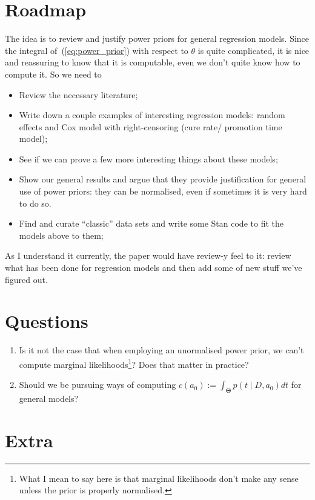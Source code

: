 \documentclass[a4paper, notitlepage, 11pt]{article}
\begin{document}
\section{Roadmap}
The idea is to review and justify power priors for general regression models.
Since the integral of~(\ref{eq:power_prior}) with respect to $\theta$ is quite complicated, it is nice and reassuring to know that it is computable, even we don't quite know how to compute it.
So we need to
\begin{itemize}
 \item Review the necessary literature;
 \item Write down a couple examples of interesting regression models: random effects and Cox model with right-censoring (cure rate/ promotion time model);
 \item See if we can prove a few more interesting things about these models;
 \item Show our general results and argue that they provide justification for general use of power priors: they can be normalised, even if sometimes it is very hard to do so.
 \item Find and curate ``classic'' data sets and write some Stan code to fit the models above to them;
\end{itemize}
As I understand it currently, the paper would have review-y feel to it: review what has been done for regression models and then add some of new stuff we've figured out.

\section{Questions}

\begin{enumerate}
 \item Is it not the case that when employing an unormalised power prior, we can't compute marginal likelihoods\footnote{What I mean to say here is that marginal likelihoods don't make any sense unless the prior is properly normalised.}? Does that matter in practice?
 \item Should we be pursuing ways of computing $c(a_0) := \int_{\boldsymbol \Theta} p(t \mid D, a_0)dt$ for general models? 
\end{enumerate}

\section*{Extra}
\end{document}

